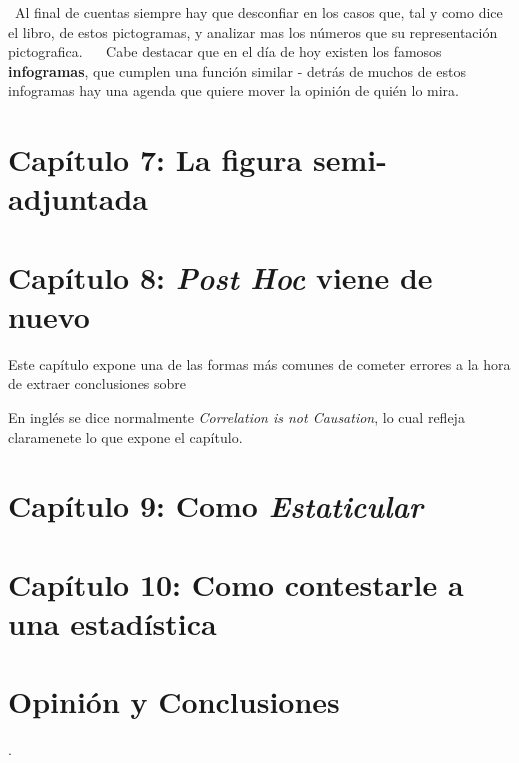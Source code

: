 \documentclass[letterpaper, 11pt]{article}
\begin{document}
 Al final de cuentas siempre hay que desconfiar en los casos que, tal y como dice el libro, de estos pictogramas, y analizar mas los números que su representación pictografica.
 
 Cabe destacar que en el día de hoy existen los famosos \textbf{infogramas}, que cumplen una función similar - detrás de muchos de estos infogramas hay una agenda que quiere mover la opinión de quién lo mira. 
 
 \section*{Capítulo 7: La figura semi-adjuntada}

\section*{Capítulo 8: \textit{Post Hoc} viene de nuevo}

Este capítulo expone una de las formas más comunes de cometer errores a la hora de extraer conclusiones sobre 

En inglés se dice normalmente \textit{Correlation is not Causation}, lo cual refleja claramenete lo que expone el capítulo. 

\section*{Capítulo 9: Como \textit{Estaticular}}

\section*{Capítulo 10: Como contestarle a una estadística}

\section*{Opinión y Conclusiones}

.

\end{document}
